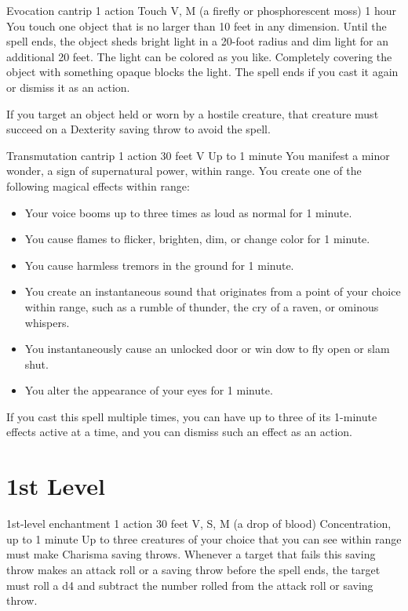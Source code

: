 \documentclass[10pt,twoside,twocolumn,openany]{book}
\begin{document}
{Evocation cantrip}
{\color{action} 1 action}
{Touch}
{V, M (a firefly or phosphorescent moss)}
{1 hour}
%
You touch one object that is no larger than 10 feet in any dimension. Until the 
spell ends, the object sheds bright light in a 20-foot radius and dim light 
for an additional 20 feet. The light can be colored as you like. Completely 
covering the object with something opaque blocks the light. The spell ends 
if you cast it again or dismiss it as an action. 

If you target an object held or worn by a hostile creature, that creature 
must succeed on a Dexterity saving throw to avoid the spell.

{Transmutation cantrip}
{\color{action} 1 action}
{30 feet}
{V}
{Up to 1 minute}
%
You manifest a minor wonder, a sign of supernatural power, within range. You create one of the following magical effects within range:
\begin{itemize}
	\item Your voice booms up to three times as loud as normal for 1 minute.
	\item You cause flames to flicker, brighten, dim, or change color for 1 minute.
	\item You cause harmless tremors in the ground for 1 minute.
	\item You create an instantaneous sound that originates from a point of your choice within range, such as a rumble of thunder, the cry of a raven, or ominous whispers.
	\item You instantaneously cause an unlocked door or win  dow to fly open or slam shut.
	\item You alter the appearance of your eyes for 1 minute.
\end{itemize}
If you cast this spell multiple times, you can have up to three of its 1-minute effects active at a time, and you can dismiss such an effect as an action.

\clearpage
\section{1st Level}
{1st-level enchantment}
{\color{action} 1 action}
{30 feet}
{V, S, M (a drop of blood)}
{{\color{concentration}Concentration}, up to 1 minute}
%
Up to three creatures of your choice that you can see within range must make Charisma saving throws. Whenever a target that fails this saving throw makes an attack roll or a saving throw before the spell ends, the target must roll a d4 and subtract the number rolled from the attack roll or saving throw.
\end{document}
